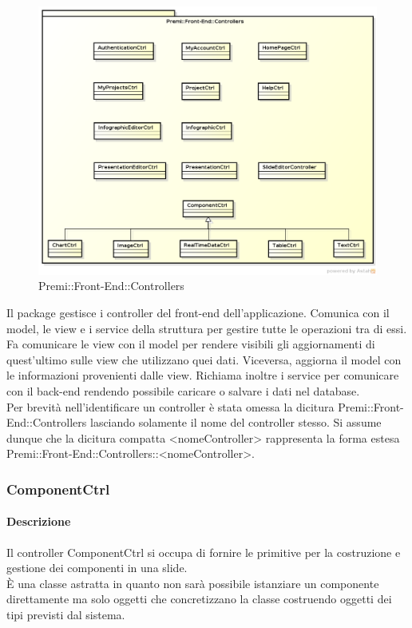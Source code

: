\begin{figure}[h]
	\centering
	\includegraphics[width=1.0\linewidth]{img/premi_front_end_controllers}
	\caption[Premi::Front-End::Controllers]{Premi::Front-End::Controllers}
\end{figure}
Il package gestisce i controller del front-end dell'applicazione. Comunica con il model, le view e i service della struttura per gestire tutte le operazioni tra di essi. Fa comunicare le view con il model per rendere visibili gli aggiornamenti di quest'ultimo sulle view che utilizzano quei dati. Viceversa, aggiorna il model con le informazioni provenienti dalle view. Richiama inoltre i service per comunicare con il back-end rendendo possibile caricare o salvare i dati nel database.\\
Per brevità nell'identificare un controller è stata omessa la dicitura Premi::Front-End::Controllers lasciando solamente il nome del controller stesso. Si assume dunque che la dicitura compatta <nomeController> rappresenta la forma estesa Premi::Front-End::Controllers::<nomeController>.

\newpage

\subsubsection{ComponentCtrl}
      \paragraph{Descrizione}
	Il controller ComponentCtrl si occupa di fornire le primitive per la costruzione e gestione dei componenti in una slide.\\
	È una classe astratta in quanto non sarà possibile istanziare un componente direttamente ma solo oggetti che concretizzano la classe costruendo oggetti dei tipi previsti dal sistema.\\
		
